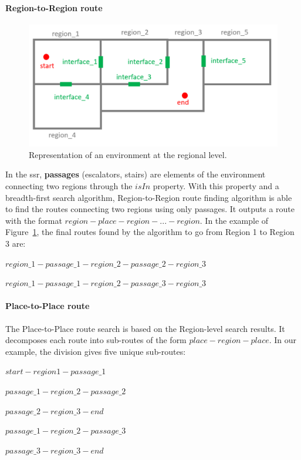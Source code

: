 \documentclass[a4paper,11pt,twoside]{StyleThese}
\begin{document}
\paragraph{Region-to-Region route}

\begin{figure}[b]
	\centering
	\includegraphics[scale=0.17]{figures/chapter3/regions.png}
	\caption{\label{fig:chap3_regions} Representation of an environment at the regional level.}
\end{figure}

In the \acrshort{ssr}, \textbf{passages} (\eg escalators, stairs) are elements of the environment connecting two regions through the $isIn$ property. With this property and a breadth-first search algorithm, Region-to-Region route finding algorithm is able to find the routes connecting two regions using only passages. It outputs a route with the format $region - place - region - ... - region$. In the example of Figure~\ref{fig:chap3_regions}, the final routes found by the algorithm to go from Region 1 to Region 3 are:

\begin{bulletList}
	\item \(region\_1 - passage\_1 - region\_2 - passage\_2 - region\_3\)
	\item \(region\_1 - passage\_1 - region\_2 - passage\_3 - region\_3\)
\end{bulletList}


\paragraph{Place-to-Place route}

The Place-to-Place route search is based on the Region-level search results. It decomposes each route into sub-routes of the form $place - region - place$. In our example, the division gives five unique sub-routes:
\begin{bulletList}
	\item \(start - region 1 - passage\_1\)
	\item \(passage\_1 - region\_2 - passage\_2\)
	\item \(passage\_2 - region\_3 - end\)
	\item \(passage\_1 - region\_2 - passage\_3\)
	\item \(passage\_3 - region\_3 - end\)
\end{bulletList}
\end{document}
